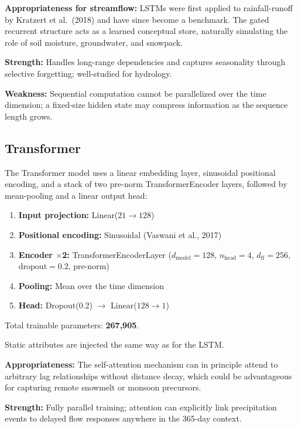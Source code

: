 \documentclass[11pt, letterpaper]{article}
\begin{document}
\textbf{Appropriateness for streamflow:} LSTMs were first applied to
rainfall-runoff by Kratzert et al.\ (2018) and have since become a benchmark.
The gated recurrent structure acts as a learned conceptual store, naturally
simulating the role of soil moisture, groundwater, and snowpack.

\textbf{Strength:} Handles long-range dependencies and captures seasonality through
selective forgetting; well-studied for hydrology.

\textbf{Weakness:} Sequential computation cannot be parallelized over the time
dimension; a fixed-size hidden state may compress information as the sequence
length grows.

\subsection{Transformer}

The Transformer model uses a linear embedding layer, sinusoidal positional
encoding, and a stack of two pre-norm TransformerEncoder layers, followed by
mean-pooling and a linear output head:

\begin{enumerate}
    \item \textbf{Input projection:} Linear($21 \rightarrow 128$)
    \item \textbf{Positional encoding:} Sinusoidal (Vaswani et al., 2017)
    \item \textbf{Encoder $\times$2:} TransformerEncoderLayer
          ($d_\text{model}=128$, $n_\text{head}=4$, $d_\text{ff}=256$,
          $\text{dropout}=0.2$, pre-norm)
    \item \textbf{Pooling:} Mean over the time dimension
    \item \textbf{Head:} Dropout(0.2) $\rightarrow$ Linear($128 \rightarrow 1$)
\end{enumerate}

\noindent Total trainable parameters: \textbf{267,905}.

Static attributes are injected the same way as for the LSTM.

\textbf{Appropriateness:} The self-attention mechanism can in principle attend
to arbitrary lag relationships without distance decay, which could be
advantageous for capturing remote snowmelt or monsoon precursors.

\textbf{Strength:} Fully parallel training; attention can explicitly link
precipitation events to delayed flow responses anywhere in the 365-day context.
\end{document}
